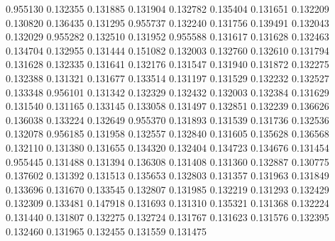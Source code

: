 0.955130
0.132355
0.131885
0.131904
0.132782
0.135404
0.131651
0.132209
0.130820
0.136435
0.131295
0.955737
0.132240
0.131756
0.139491
0.132043
0.132029
0.955282
0.132510
0.131952
0.955588
0.131617
0.131628
0.132463
0.134704
0.132955
0.131444
0.151082
0.132003
0.132760
0.132610
0.131794
0.131628
0.132335
0.131641
0.132176
0.131547
0.131940
0.131872
0.132275
0.132388
0.131321
0.131677
0.133514
0.131197
0.131529
0.132232
0.132527
0.133348
0.956101
0.131342
0.132329
0.132432
0.132003
0.132384
0.131629
0.131540
0.131165
0.133145
0.133058
0.131497
0.132851
0.132239
0.136626
0.136038
0.133224
0.132649
0.955370
0.131893
0.131539
0.131736
0.132536
0.132078
0.956185
0.131958
0.132557
0.132840
0.131605
0.135628
0.136568
0.132110
0.131380
0.131655
0.134320
0.132404
0.134723
0.134676
0.131454
0.955445
0.131488
0.131394
0.136308
0.131408
0.131360
0.132887
0.130775
0.137602
0.131392
0.131513
0.135653
0.132803
0.131357
0.131963
0.131849
0.133696
0.131670
0.133545
0.132807
0.131985
0.132219
0.131293
0.132429
0.132309
0.133481
0.147918
0.131693
0.131310
0.135321
0.131368
0.132224
0.131440
0.131807
0.132275
0.132724
0.131767
0.131623
0.131576
0.132395
0.132460
0.131965
0.132455
0.131559
0.131475
